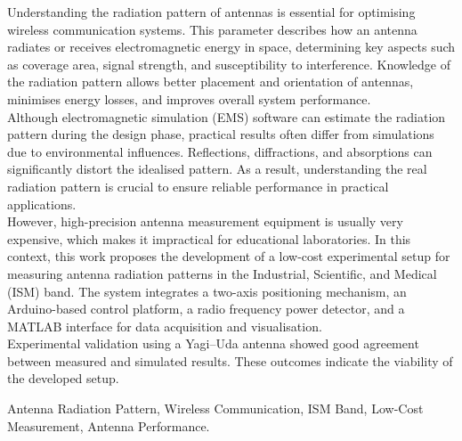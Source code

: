 Understanding the radiation pattern of antennas is essential for optimising wireless communication systems. This parameter describes how an antenna radiates or receives electromagnetic energy in space, determining key aspects such as coverage area, signal strength, and susceptibility to interference. Knowledge of the radiation pattern allows better placement and orientation of antennas, minimises energy losses, and improves overall system performance.\\
Although electromagnetic simulation (EMS) software can estimate the radiation pattern during the design phase, practical results often differ from simulations due to environmental influences. Reflections, diffractions, and absorptions can significantly distort the idealised pattern. As a result, understanding the real radiation pattern is crucial to ensure reliable performance in practical applications.\\
However, high-precision antenna measurement equipment is usually very expensive, which makes it impractical for educational laboratories. In this context, this work proposes the development of a low-cost experimental setup for measuring antenna radiation patterns in the Industrial, Scientific, and Medical (ISM) band. The system integrates a two-axis positioning mechanism, an Arduino-based control platform, a radio frequency power detector, and a MATLAB interface for data acquisition and visualisation.\\
Experimental validation using a Yagi–Uda antenna showed good agreement between measured and simulated results. These outcomes indicate the viability of the developed setup.


 Antenna Radiation Pattern, Wireless Communication, ISM Band, Low-Cost Measurement, Antenna Performance.


